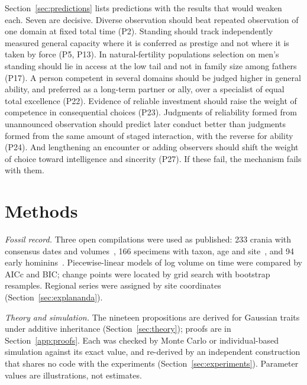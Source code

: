 Section~\ref{sec:predictions} lists \NPred{} predictions with the results that would weaken each. Seven are decisive.
Diverse observation should beat repeated observation of one domain at fixed total time (P2). Standing should track
independently measured general capacity where it is conferred as prestige and not where it is taken by force (P5, P13). In
natural-fertility populations selection on men's standing should lie in access at the low tail and not in family size among
fathers (P17). A person competent in several domains should be judged higher in general ability, and preferred as a
long-term partner or ally, over a specialist of equal total excellence (P22). Evidence of reliable investment should
raise the weight of competence in consequential choices (P23). Judgments of reliability formed from unannounced
observation should predict later conduct better than judgments formed from the same amount of staged interaction, with the
reverse for ability (P24). And lengthening an encounter or adding observers should shift the weight of choice toward
intelligence and sincerity (P27). If these fail, the mechanism fails with them.

\section{Methods}\label{sec:methods}

\emph{Fossil record.} Three open compilations were used as published: 233 crania with consensus dates and
volumes~\cite{gingerich2022}, 166 \Homo{} specimens with taxon, age and site~\cite{will2021}, and 94 early
hominins~\cite{du2018}. Piecewise-linear models of log volume on time were compared by AICc and BIC; change points were
located by grid search with \FosBoot{} bootstrap resamples. Regional series were assigned by site coordinates
(Section~\ref{sec:explananda}).

\emph{Theory and simulation.} The nineteen propositions are derived for Gaussian traits under additive inheritance
(Section~\ref{sec:theory}); proofs are in Section~\ref{app:proofs}. Each was checked by Monte Carlo or individual-based
simulation against its exact value, and re-derived by an independent construction that shares no code with the experiments
(Section~\ref{sec:experiments}). Parameter values are illustrations, not estimates.

